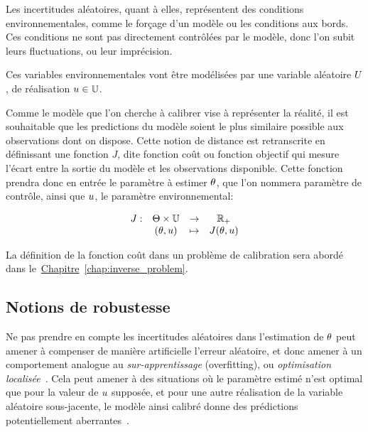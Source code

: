 \documentclass[../../Main_ManuscritThese.tex]{subfiles}
\newcommand{\frchap}[1]{\hyperref[#1]{Chapitre}~\ref{#1}}
\begin{document}
Les incertitudes aléatoires, quant à elles, représentent des
conditions environnementales, comme le forçage d'un modèle ou les
conditions aux bords. Ces conditions ne sont pas directement
contrôlées par le modèle, donc l'on subit leurs fluctuations, ou leur
imprécision.

Ces variables environnementales vont être modélisées par une variable
aléatoire $U$, de réalisation $u\in \mathbb{U}$.

Comme le modèle que l'on cherche à calibrer vise à représenter la
réalité, il est souhaitable que les predictions du modèle soient le
plus similaire possible aux observations dont on dispose. Cette notion
de distance est retranscrite en définissant une fonction $J$, dite
fonction coût ou fonction objectif qui mesure l'écart entre la sortie
du modèle et les observations disponible. Cette fonction prendra donc
en entrée le paramètre à estimer $\theta$, que l'on nommera paramètre de
contrôle, ainsi que $u$, le paramètre environnemental:

\begin{equation*}
  \label{eq:def_J}
  \begin{array}{rccc}
   J: & \Theta\times\mathbb{U}& \rightarrow& \mathbb{R}_+ \\
   &(\theta,u)& \mapsto& J(\theta,u)
  \end{array}
\end{equation*}

La définition de la fonction coût dans un problème de calibration sera abordé dans le~\frchap{chap:inverse_problem}.

\subsection*{Notions de robustesse}

Ne pas prendre en compte les incertitudes aléatoires dans l'estimation
de $\theta$ peut amener à compenser de manière artificielle l'erreur
aléatoire, et donc amener à un comportement analogue au
\emph{sur-apprentissage} (overfitting), ou \emph{optimisation
  localisée}~\cite{huyse_probabilistic_2002}. Cela peut amener à des
situations où le paramètre estimé n'est optimal que pour la valeur de
$u$ supposée, et pour une autre réalisation de la variable aléatoire
sous-jacente, le modèle ainsi calibré donne des prédictions
potentiellement aberrantes~\cite{kuczera_there_2010}.
\end{document}

